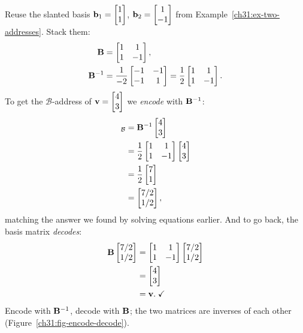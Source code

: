 \begin{example}
\label{ch31:ex-translate}
Reuse the slanted basis $\mathbf{b}_1=\begin{bmatrix}1\\1\end{bmatrix}$, $\mathbf{b}_2=\begin{bmatrix}1\\-1\end{bmatrix}$ from
Example~\ref{ch31:ex-two-addresses}. Stack them:
\begin{align*}
  \mathbf{B} &= \begin{bmatrix} 1 & 1\\ 1 & -1\end{bmatrix}, \\
  \mathbf{B}^{-1} &= \frac{1}{-2}\begin{bmatrix} -1 & -1\\ -1 & 1\end{bmatrix}
  = \frac12\begin{bmatrix} 1 & 1\\ 1 & -1\end{bmatrix}.
\end{align*}
To get the $\mathcal{B}$-address of $\mathbf{v}=\begin{bmatrix}4\\3\end{bmatrix}$ we \emph{encode} with
$\mathbf{B}^{-1}$:
\begin{align*}
  [\vec{v}]_{\mathcal{B}} &= \mat{B}\inv\colvec{4\\3} \\
  &= \frac12\begin{bmatrix} 1 & 1\\ 1 & -1\end{bmatrix}\colvec{4\\3} \\
  &= \frac12\colvec{7\\1} \\
  &= \colvec{7/2\\1/2},
\end{align*}
matching the answer we found by solving equations earlier. And to go back, the
basis matrix \emph{decodes}:
\begin{align*}
  \mathbf{B}\begin{bmatrix}7/2\\1/2\end{bmatrix} &= \begin{bmatrix} 1 & 1\\ 1 & -1\end{bmatrix}\begin{bmatrix}7/2\\1/2\end{bmatrix} \\
  &= \begin{bmatrix}4\\3\end{bmatrix} \\
  &= \mathbf{v}.\;\checkmark
\end{align*}
Encode with $\mathbf{B}^{-1}$, decode with $\mathbf{B}$; the two matrices are inverses
of each other (Figure~\ref{ch31:fig-encode-decode}).
\end{example}

